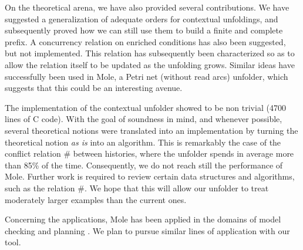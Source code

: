 \documentclass[11pt,a4paper]{article}
\newcommand{\confl}{\ensuremath{\mathord{\#}}}
\begin{document}
On the theoretical arena, we have also provided several contributions.  We have
suggested a generalization of adequate orders for contextual unfoldings, and
subsequently proved how we can still use them to build a finite and complete
prefix.  A concurrency relation on enriched conditions has also been suggested,
but not implemented.  This relation has subsequently been characterized so as
to allow the relation itself to be updated as the unfolding grows.  Similar
ideas have successfully been used in Mole, a Petri net (without read arcs)
unfolder, which suggests that this could be an interesting avenue.

The implementation of the contextual unfolder showed to be non trivial (4700
lines of C code).  With the goal of soundness in mind, and whenever possible,
several theoretical notions were translated into an implementation by turning
the theoretical notion \emph{as is} into an algorithm.  This is remarkably the
case of the conflict relation $\confl$ between histories, where the unfolder
spends in average more than 85\% of the time.  Consequently, we do not reach
still the performance of Mole.  Further work is required to review certain data
structures and algorithms, such as the relation $\confl$.  We hope that this
will allow our unfolder to treat moderately larger examples than the current
ones.

Concerning the applications, Mole has been applied in the domains of model
checking and planning .  We plan to pursue similar lines of
application with our tool.


%

\nocite{*}



\end{document}
